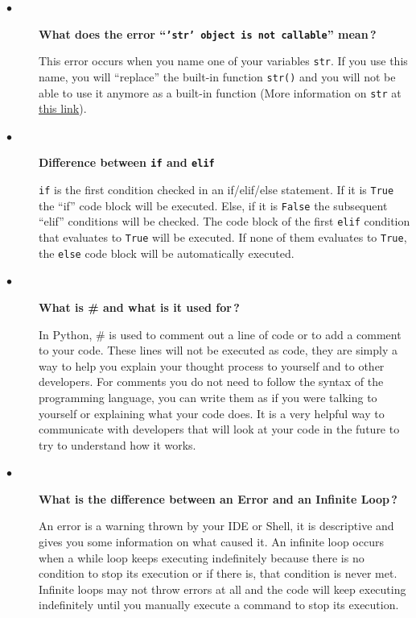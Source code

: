 \documentclass{article}
\newcommand{\inlinecode}[1]{\texttt{#1}}
\newcommand{\link}[2]{\textcolor{blue}{\href{#2}{#1}}}
\newcommand{\question}[1]{\item[$\bullet$] 
	\begin{minipage}[t]{\textwidth}
		\bfseries#1
	\end{minipage}
	\hfil
}
\newenvironment{answer}{}{}
\newenvironment{faq}{\begin{description}}{\end{description}}
\begin{document}
\begin{faq}
		\question{What does the error ``\inlinecode{'str' object is not callable}'' mean\,?}
		\begin{answer}
			This error occurs when you name one of your variables \inlinecode{str}. If you use this
			name, you will ``replace'' the built-in function \inlinecode{str()} and you will not be able to
			use it anymore as a built-in function (More information on \inlinecode{str} at \link{this link}{https://docs.python.org/3/library/functions.html\#func-str}).
		\end{answer}
		
		\question{Difference between \inlinecode{if} and \inlinecode{elif}}
		\begin{answer}
			\inlinecode{if} is the first condition checked in an if/elif/else statement. If it is \inlinecode{True} the ``if'' code block will be executed. Else, if it is \inlinecode{False} the subsequent ``elif'' conditions will be checked. The code block of the first \inlinecode{elif} condition that evaluates to \inlinecode{True} will be executed. If none of them evaluates to \inlinecode{True}, the \inlinecode{else} code block will be automatically executed.
		\end{answer}
		
		\question{What is \# and what is it used for\,?}
		\begin{answer}
			In Python, \# is used to comment out a line of code or to add a comment to your code. These lines will not be executed as code, they are simply a way to help you explain your thought process to yourself and to other developers. For comments you do not need to follow the syntax of the programming language, you can write them as if you were talking to yourself or explaining what your code does. It is a very helpful way to communicate with developers that will look at your code in the future to try to understand how it works.
		\end{answer}
		
		\question{What is the difference between an Error and an Infinite Loop\,?}
		\begin{answer}
			An error is a warning thrown by your IDE or Shell, it is descriptive and gives
			you some information on what caused it. An infinite loop occurs when a while
			loop keeps executing indefinitely because there is no condition to stop its
			execution or if there is, that condition is never met. Infinite loops may not
			throw errors at all and the code will keep executing indefinitely until you
			manually execute a command to stop its execution.
		\end{answer}
		

\end{faq}
\end{document}
